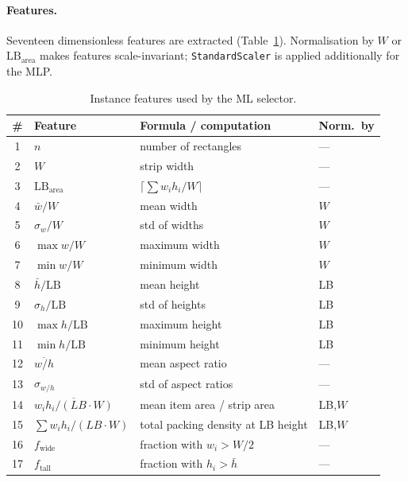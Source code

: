 \documentclass[11pt,a4paper]{article}
\begin{document}
\paragraph{Features.}
Seventeen dimensionless features are extracted (Table~\ref{tab:features}).
Normalisation by $W$ or $\mathrm{LB}_{\text{area}}$ makes features
scale-invariant; \texttt{StandardScaler} is applied additionally for the MLP.

\begin{table}[h]
\centering
\caption{Instance features used by the ML selector.}
\label{tab:features}
\small
\begin{tabular}{clll}
\toprule
\# & Feature & Formula / computation & Norm.\ by \\
\midrule
1  & $n$                            & number of rectangles                          & --- \\
2  & $W$                            & strip width                                   & --- \\
3  & $\mathrm{LB}_{\text{area}}$    & $\lceil\sum w_i h_i / W\rceil$                & --- \\
4  & $\bar{w}/W$                    & mean width                                    & $W$ \\
5  & $\sigma_w/W$                   & std of widths                                 & $W$ \\
6  & $\max w/W$                     & maximum width                                 & $W$ \\
7  & $\min w/W$                     & minimum width                                 & $W$ \\
8  & $\bar{h}/\mathrm{LB}$         & mean height                                   & LB \\
9  & $\sigma_h/\mathrm{LB}$        & std of heights                                & LB \\
10 & $\max h/\mathrm{LB}$          & maximum height                                & LB \\
11 & $\min h/\mathrm{LB}$          & minimum height                                & LB \\
12 & $\overline{w/h}$               & mean aspect ratio                             & --- \\
13 & $\sigma_{w/h}$                 & std of aspect ratios                          & --- \\
14 & $\overline{w_ih_i/(LB \cdot W)}$ & mean item area / strip area                & LB,$W$ \\
15 & $\sum w_ih_i/(LB\cdot W)$      & total packing density at LB height            & LB,$W$ \\
16 & $f_{\text{wide}}$              & fraction with $w_i > W/2$                     & --- \\
17 & $f_{\text{tall}}$              & fraction with $h_i > \bar{h}$                 & --- \\
\bottomrule
\end{tabular}
\end{table}
\end{document}
